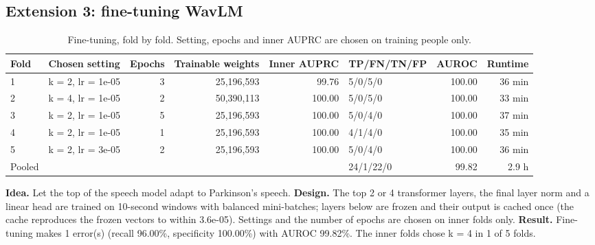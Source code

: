 \documentclass[11pt,a4paper]{article}
\begin{document}
\subsection{Extension 3: fine-tuning WavLM}\label{sec:ext3}
\begin{table}[H]\centering\footnotesize\renewcommand{\arraystretch}{1.15}
\caption{Fine-tuning, fold by fold. Setting, epochs and inner AUPRC are chosen on training people only.}
\begin{tabular}{llrrrlrr}
\toprule
\textbf{Fold} & \textbf{Chosen setting} & \textbf{Epochs} & \textbf{Trainable weights} & \textbf{Inner AUPRC} & \textbf{TP/FN/TN/FP} & \textbf{AUROC} & \textbf{Runtime}\\
\midrule
1 & k = 2, lr = 1e-05 & 3 & 25,196,593 & 99.76 & 5/0/5/0 & 100.00 & 36 min\\
2 & k = 4, lr = 1e-05 & 2 & 50,390,113 & 100.00 & 5/0/5/0 & 100.00 & 33 min\\
3 & k = 2, lr = 1e-05 & 5 & 25,196,593 & 100.00 & 5/0/4/0 & 100.00 & 37 min\\
4 & k = 2, lr = 1e-05 & 1 & 25,196,593 & 100.00 & 4/1/4/0 & 100.00 & 35 min\\
5 & k = 2, lr = 3e-05 & 2 & 25,196,593 & 100.00 & 5/0/4/0 & 100.00 & 36 min\\
Pooled &  &  &  &  & 24/1/22/0 & 99.82 & 2.9 h\\
\bottomrule
\end{tabular}\end{table}
\textbf{Idea.} Let the top of the speech model adapt to Parkinson's speech. \textbf{Design.} The top 2 or 4 transformer layers, the final layer norm and a linear head are trained on 10-second windows with balanced mini-batches; layers below are frozen and their output is cached once (the cache reproduces the frozen vectors to within 3.6e-05). Settings and the number of epochs are chosen on inner folds only. \textbf{Result.} Fine-tuning makes 1 error(s) (recall 96.00\%, specificity 100.00\%) with AUROC 99.82\%. The inner folds chose k = 4 in 1 of 5 folds.
\end{document}
